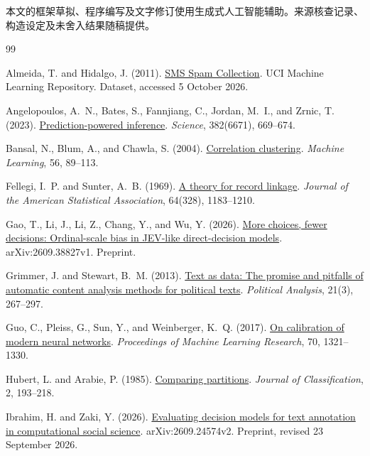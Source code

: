 \documentclass[UTF8,a4paper,zihao=-4,fontset=fandol]{ctexart}
\begin{document}
本文的框架草拟、程序编写及文字修订使用生成式人工智能辅助。来源核查记录、构造设定及未舍入结果随稿提供。

\begin{thebibliography}{99}
\small

Almeida, T. and Hidalgo, J. (2011).
\href{https://doi.org/10.24432/C5CC84}{SMS Spam Collection}.
UCI Machine Learning Repository. Dataset, accessed 5 October 2026.

Angelopoulos, A.~N., Bates, S., Fannjiang, C., Jordan, M.~I., and Zrnic, T. (2023).
\href{https://doi.org/10.1126/science.adi6000}{Prediction-powered inference}.
\emph{Science}, 382(6671), 669--674.

Bansal, N., Blum, A., and Chawla, S. (2004).
\href{https://doi.org/10.1023/B:MACH.0000033116.57574.95}{Correlation clustering}.
\emph{Machine Learning}, 56, 89--113.

Fellegi, I.~P. and Sunter, A.~B. (1969).
\href{https://doi.org/10.1080/01621459.1969.10501049}{A theory for record linkage}.
\emph{Journal of the American Statistical Association}, 64(328), 1183--1210.

Gao, T., Li, J., Li, Z., Chang, Y., and Wu, Y. (2026).
\href{https://arxiv.org/abs/2609.38827v1}{More choices, fewer decisions: Ordinal-scale bias in JEV-like direct-decision models}.
arXiv:2609.38827v1. Preprint.

Grimmer, J. and Stewart, B.~M. (2013).
\href{https://doi.org/10.1093/pan/mps028}{Text as data: The promise and pitfalls of automatic content analysis methods for political texts}.
\emph{Political Analysis}, 21(3), 267--297.

Guo, C., Pleiss, G., Sun, Y., and Weinberger, K.~Q. (2017).
\href{https://proceedings.mlr.press/v70/guo17a.html}{On calibration of modern neural networks}.
\emph{Proceedings of Machine Learning Research}, 70, 1321--1330.

Hubert, L. and Arabie, P. (1985).
\href{https://doi.org/10.1007/BF01908075}{Comparing partitions}.
\emph{Journal of Classification}, 2, 193--218.

Ibrahim, H. and Zaki, Y. (2026).
\href{https://arxiv.org/abs/2609.24574v2}{Evaluating decision models for text annotation in computational social science}.
arXiv:2609.24574v2. Preprint, revised 23 September 2026.


\end{thebibliography}
\end{document}
